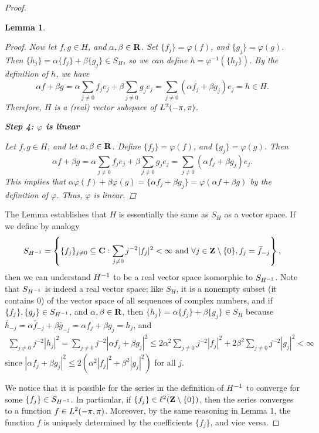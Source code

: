 \documentclass{homework}
\newtheorem{lemma}{Lemma}
\begin{document}
\begin{arabicparts}
\begin{proof}
\begin{lemma}
\begin{proof}
			Now let $f,g \in H$, and $\alpha,\beta\in\textbf{R}$. Set $\{f_j\} = \varphi(f)$, and $\{g_j\} = \varphi(g)$. Then $\{h_j\} = \alpha\{f_j\} + \beta\{g_j\}\in S_H$, so we can define $h =\varphi^{-1}(\{h_j\})$. By the definition of $h$, we have
			\begin{equation}
				\alpha f + \beta g = \alpha \sum_{j\ne 0}f_je_j + \beta\sum_{j\ne 0}g_je_j = \sum_{j\ne 0}(\alpha f_j + \beta g_j)e_j = h \in H.
			\end{equation}
			Therefore, $H$ is a (real) vector subspace of ${L^2(-\pi,\pi)}$.
			
			\textbf{Step 4: $\varphi$ is linear}
			
			Let $f,g\in H$, and let $\alpha,\beta\in \textbf{R}$. Define $\{f_j\} = \varphi(f)$, and $\{g_j\} = \varphi(g)$. Then
			\begin{equation}
				\alpha f + \beta g = \alpha \sum_{j\ne 0}f_je_j + \beta\sum_{j\ne0}g_je_j = \sum_{j\ne0}(\alpha f_j + \beta g_j)e_j.
			\end{equation}
			This implies that $\alpha\varphi(f) + \beta\varphi(g) = \{\alpha f_j + \beta g_j\} = \varphi(\alpha f + \beta g)$ by the definition of $\varphi$. Thus, $\varphi$ is linear.
		\end{proof}
		\end{lemma}
		The Lemma establishes that $H$ is essentially the same as $S_H$ as a vector space. If we define by analogy
		\begin{equation}
			S_{H^{-1}} = \left\{\{f_j\}_{j\ne0}\subseteq \textbf{C} : \sum_{j\ne0}j^{-2}|f_j|^2 < \infty \text{ and } \forall j\in\textbf{Z}\setminus\{0\}, f_j = \bar{f}_{-j}\right\},
		\end{equation}
		then we can understand ${H^{-1}}$ to be a real vector space isomorphic to $S_{H^{-1}}$. Note that $S_{H^{-1}}$ is indeed a real vector space; like $S_H$, it is a nonempty subset (it contains 0) of the vector space of all sequences of complex numbers, and if $\{f_j\}, \{g_j\} \in S_{H^{-1}}$, and $\alpha,\beta\in\textbf{R}$, then $\{h_j\} = \alpha\{f_j\} + \beta\{g_j\} \in S_H$ because $\bar{h}_{-j} = \alpha\bar{f}_{-j} + \beta\bar{g}_{-j} = \alpha f_j + \beta g_j = h_j$, and
		\begin{align}
			\sum_{j\ne 0}j^{-2}|h_j|^2 = \sum_{j\ne0}j^{-2}|\alpha f_j +\beta g_j|^2 \le 2\alpha^2\sum_{j\ne0}j^{-2}|f_j|^2 + 2\beta^2\sum_{j\ne0}j^{-2}|g_j|^2 < \infty
		\end{align}
		since $|\alpha f_j + \beta g_j|^2 \le 2(\alpha^2|f_j|^2 + \beta^2|g_j|^2)$ for all $j$. 
		
		We notice that it is possible for the series in the definition of ${H^{-1}}$ to converge for some $\{f_j\} \in S_{H^{-1}}$. In particular, if $\{f_j\} \in \ell^2(\textbf{Z} \setminus\{0\})$, then the series converges to a function $f \in {L^2(-\pi,\pi)}$. Moreover, by the same reasoning in Lemma 1, the function $f$ is uniquely determined by the coefficients $\{f_j\}$, and vice versa.
		

\end{proof}
\end{arabicparts}
\end{document}
